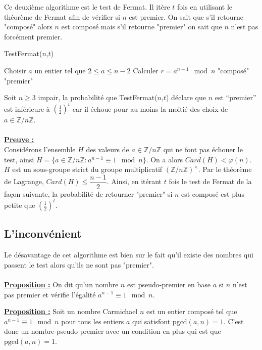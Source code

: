 Ce deuxième algorithme est le test de Fermat. Il itère $t$ fois en utilisant le théorème de Fermat afin de vérifier si $n$ est premier. On sait que s'il retourne "composé" alors $n$ est composé mais s'il retourne "premier" on sait que $n$ n'est pas forcément premier.
\begin{algorithm}
\caption{TestFermat($n$,$t$)}
\begin{algorithmic}[1]
\State Choisir $a$ un entier tel que $2\leq a \leq n-2$
\State Calculer  $r=a^{n-1} \mod n$
 \Return "composé" 
\EndIf
\EndFor
\State \Return "premier"
\end{algorithmic}
\end{algorithm}

Soit $n\geq 3$ impair, la probabilité que TestFermat($n$,$t$) déclare que $n$ est “premier” est inférieure à $\left(\frac{1}{2}\right)^{t}$ car il échoue pour au moins la moitié des choix de $a \in \mathbb {Z} /n\mathbb {Z}$. \\ \\
\underline{\textbf{Preuve :}}\\
Considérons l'ensemble $H$ des valeurs de $a \in \mathbb {Z} /n\mathbb {Z}$ qui ne font pas échouer le test, ainsi $H= \{a \in \mathbb {Z} /n\mathbb {Z}  : a^{n-1} \equiv 1 \mod n \}$. On a alors $Card(H) < \varphi(n)$. $H$ est un sous-groupe strict du groupe multiplicatif 
$(\mathbb {Z} /n\mathbb {Z} )^{\times }$. Par le théorème de Lagrange, $Card(H)\leq {\dfrac {n-1}{2}}$. Ainsi, en itérant $t$ fois le test de Fermat de la façon suivante, la probabilité de retourner "premier" si $n$ est composé est plus petite que $\left(\frac{1}{2}\right)^{t}$.
\subsection{L'inconvénient}
Le désavantage de cet algorithme est bien sur le fait qu'il existe des nombres qui passent le test alors qu'ils ne sont pas "premier".
\\ \\
\underline{\textbf{Proposition :}}
On dit qu’un nombre $n$ est pseudo-premier en base $a$ si $n$ n’est pas premier et vérifie l’égalité $a^{n-1} \equiv 1 \mod n $.

\underline{\textbf{Proposition :}} Soit un nombre Carmichael $n$ est un entier composé tel que $a^{n-1} \equiv 1 \mod n$ pour tous les entiers $a$ qui satisfont $\text{pgcd}(a,n)=1$. C'est donc un nombre-pseudo premier avec un condition en plus qui est que $\text{pgcd}(a,n)=1$.


